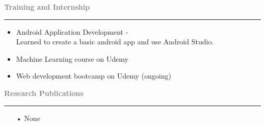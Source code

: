 \documentclass[11.5pt,a4paper]{article}
\begin{document}
\textbf{\textcolor{gray}{\huge Training and Internship}}\hrule
\begin{itemize}
\item Android Application Development -\\
Learned to create a basic android app and use Android Studio.
\item Machine Learning course on Udemy
\item Web development bootcamp on Udemy (ongoing)
\end{itemize}

\textbf{\textcolor{gray}{\huge Research Publications}}\\ \hrule
\begin{itemize}
\item[•]None
\end{itemize}
\end{document}

